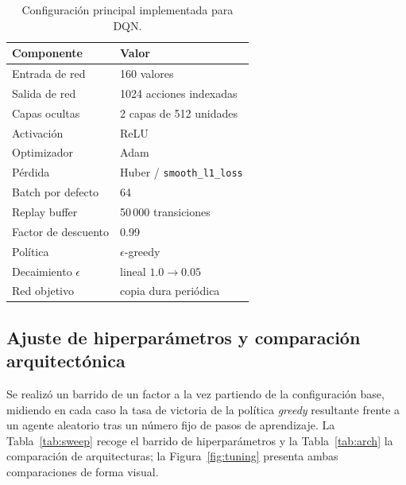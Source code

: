 \documentclass[11pt,a4paper]{article}
\begin{document}
\begin{table}[H]
\centering
\caption{Configuración principal implementada para DQN.}
\label{tab:config}
\begin{tabular}{ll}
\toprule
Componente & Valor \\
\midrule
Entrada de red & 160 valores \\
Salida de red & 1024 acciones indexadas \\
Capas ocultas & 2 capas de 512 unidades \\
Activación & ReLU \\
Optimizador & Adam \\
Pérdida & Huber / \texttt{smooth\_l1\_loss} \\
Batch por defecto & 64 \\
Replay buffer & 50\,000 transiciones \\
Factor de descuento & 0.99 \\
Política & $\epsilon$-greedy \\
Decaimiento $\epsilon$ & lineal $1.0 \to 0.05$ \\
Red objetivo & copia dura periódica \\
\bottomrule
\end{tabular}
\end{table}

\subsection{Ajuste de hiperparámetros y comparación arquitectónica}

Se realizó un barrido de un factor a la vez partiendo de la configuración base, midiendo en cada caso la tasa de victoria de la política \textit{greedy} resultante frente a un agente aleatorio tras un número fijo de pasos de aprendizaje. La Tabla~\ref{tab:sweep} recoge el barrido de hiperparámetros y la Tabla~\ref{tab:arch} la comparación de arquitecturas; la Figura~\ref{fig:tuning} presenta ambas comparaciones de forma visual.
\end{document}
